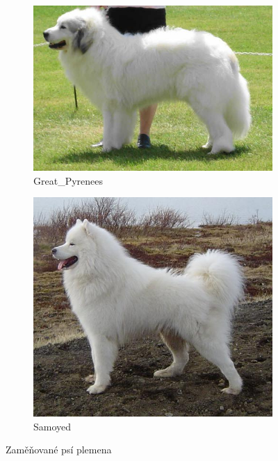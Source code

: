 \documentclass[a4paper,12pt]{article}
\begin{document}
\begin{figure}[ht!]
    \begin{subfigure}{0.35\linewidth}
        \centering
        \includegraphics[width=1\linewidth]{Figures/great_pyrenees.jpg}
        \caption{Great\_Pyrenees}
    \end{subfigure}
    \begin{subfigure}{0.35\linewidth}
        \centering
        \includegraphics[width=1\linewidth]{Figures/samoyed.jpg}
        \caption{Samoyed}
    \end{subfigure}

    \caption{Zaměňované psí plemena}
    \label{fig:lukeland_airedale}
\end{figure}
\end{document}
